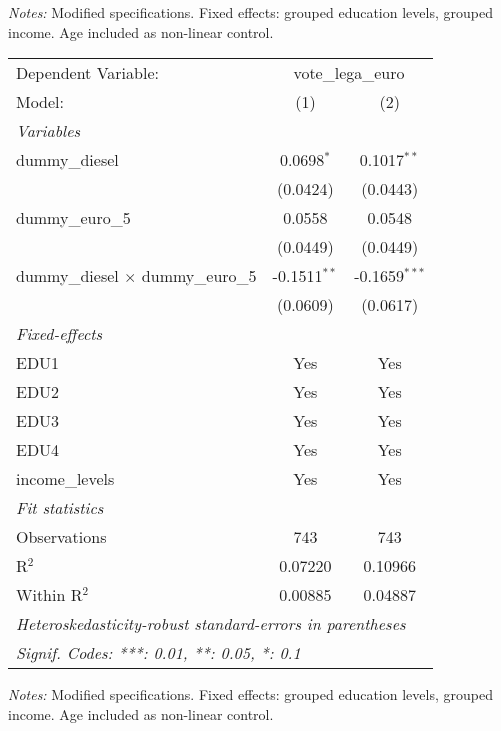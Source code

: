 \par \raggedright 
\textit{Notes:} Modified specifications. Fixed effects: grouped education levels, grouped income. Age included as non-linear control.
\par\endgroup



\begingroup
\centering
\begin{tabular}{lcc}
   \tabularnewline \midrule \midrule
   Dependent Variable: & \multicolumn{2}{c}{vote\_lega\_euro}\\
   Model:                                    & (1)            & (2)\\  
   \midrule
   \emph{Variables}\\
   dummy\_diesel                             & 0.0698$^{*}$   & 0.1017$^{**}$\\   
                                             & (0.0424)       & (0.0443)\\   
   dummy\_euro\_5                            & 0.0558         & 0.0548\\   
                                             & (0.0449)       & (0.0449)\\   
   dummy\_diesel $\times$ dummy\_euro\_5     & -0.1511$^{**}$ & -0.1659$^{***}$\\   
                                             & (0.0609)       & (0.0617)\\   
   \midrule
   \emph{Fixed-effects}\\
   EDU1                                      & Yes            & Yes\\  
   EDU2                                      & Yes            & Yes\\  
   EDU3                                      & Yes            & Yes\\  
   EDU4                                      & Yes            & Yes\\  
   income\_levels                            & Yes            & Yes\\  
   \midrule
   \emph{Fit statistics}\\
   Observations                              & 743            & 743\\  
   R$^2$                                     & 0.07220        & 0.10966\\  
   Within R$^2$                              & 0.00885        & 0.04887\\  
   \midrule \midrule
   \multicolumn{3}{l}{\emph{Heteroskedasticity-robust standard-errors in parentheses}}\\
   \multicolumn{3}{l}{\emph{Signif. Codes: ***: 0.01, **: 0.05, *: 0.1}}\\
\end{tabular}
 
\par \raggedright 
\textit{Notes:} Modified specifications. Fixed effects: grouped education levels, grouped income. Age included as non-linear control.
\par\endgroup


